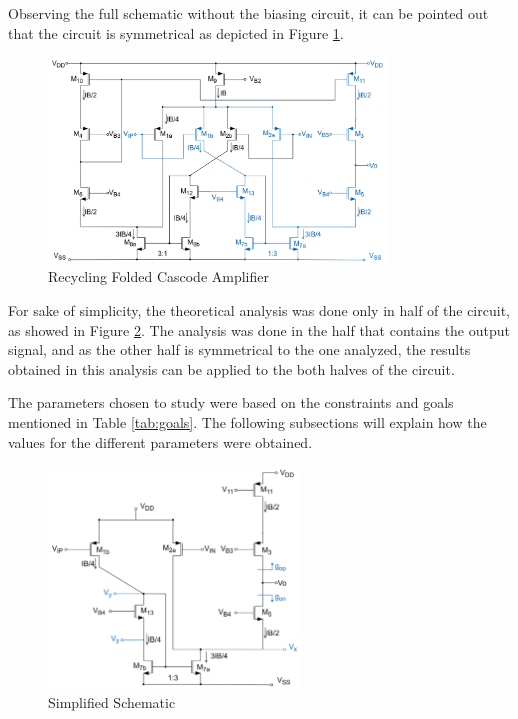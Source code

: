 Observing the full schematic without the biasing circuit, it can be pointed out that the circuit is symmetrical as depicted in Figure \ref{fig:full_schematic}. 

\begin{figure}[H]
    \centering
    \includegraphics[width=0.8\textwidth]{Images/full_sch.png}
    \caption{Recycling Folded Cascode Amplifier}
    \label{fig:full_schematic}
\end{figure}

For sake of simplicity, the theoretical analysis was done only in half of the circuit, as showed in Figure \ref{fig:simplified_schematic}. The analysis was done in the half that contains the output signal, and as the other half is symmetrical to the one analyzed, the results obtained in this analysis can be applied to the both halves of the circuit. 

The parameters chosen to study were based on the constraints and goals mentioned in Table \ref{tab:goals}. The following subsections will explain how the values for the different parameters were obtained.

\begin{figure}[H]
    \centering
    \includegraphics[width=0.6\textwidth]{Images/simplified_sch.png}
    \caption{Simplified Schematic}
    \label{fig:simplified_schematic}
\end{figure}

